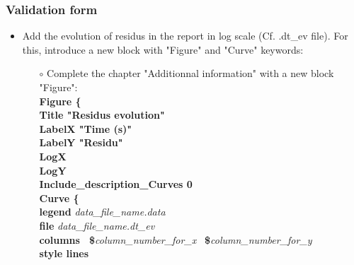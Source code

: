 \documentclass[10pt]{beamer}
\begin{document}
\begin{frame}
\frametitle{Validation form}
\begin{block}{}

\begin{itemize}
\item Add the evolution of residus in the report in log scale (Cf. .dt\_ev file). For this, introduce a new block with "Figure" and "Curve" keywords:
    \begin{itemize}
    \item [$\circ$] Complete the chapter "Additionnal information" with a new block "Figure":\\
    {\scriptsize{
    \hspace{.3cm} \textbf{Figure \{}  \\
    \hspace{.6cm} \textbf{Title "Residus evolution"}  \\
    \hspace{.6cm} \textbf{LabelX "Time (s)"}  \\
    \hspace{.6cm} \textbf{LabelY "Residu"}  \\
    \hspace{.6cm} \textbf{LogX}  \\
    \hspace{.6cm} \textbf{LogY}  \\
    \hspace{.6cm} \textbf{Include\_description\_Curves 0}  \\
    \hspace{.6cm} \textbf{Curve \{ }  \\
    \hspace{.8cm} \textbf{legend} \textit{data\_file\_name.data}  \\
    \hspace{.8cm} \textbf{file} \textit{data\_file\_name.dt\_ev} \\
    \hspace{.8cm} \textbf{columns \, \$}\textit{column\_number\_for\_x} \, \textbf{\$}\textit{column\_number\_for\_y }  \\
    \hspace{.8cm} \textbf{style lines} \\
}}
\end{itemize}
\end{itemize}
\end{block}
\end{frame}
\end{document}
